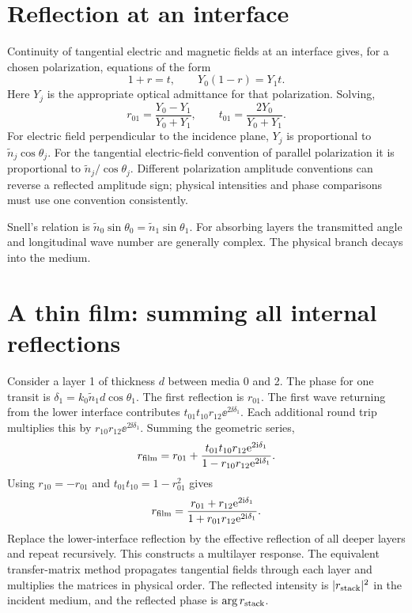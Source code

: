 \section{Reflection at an interface}
Continuity of tangential electric and magnetic fields at an interface
gives, for a chosen polarization, equations of the form
\[
1+r=t,\qquad Y_0(1-r)=Y_1t.
\]
Here $Y_j$ is the appropriate optical admittance for that polarization.
Solving,
\begin{equation}
r_{01}=\frac{Y_0-Y_1}{Y_0+Y_1},\qquad
t_{01}=\frac{2Y_0}{Y_0+Y_1}.
\label{eq:fresnelr}
\end{equation}
For electric field perpendicular to the incidence plane,
$Y_j$ is proportional to $\widetilde n_j\cos\theta_j$.
For the tangential electric-field convention of parallel polarization
it is proportional to $\widetilde n_j/\cos\theta_j$.
Different polarization amplitude conventions can reverse a reflected
amplitude sign; physical intensities and phase comparisons must use
one convention consistently.

Snell's relation is
$\widetilde n_0\sin\theta_0=\widetilde n_1\sin\theta_1$.
For absorbing layers the transmitted angle and longitudinal wave number
are generally complex. The physical branch decays into the medium.

\section{A thin film: summing all internal reflections}
Consider a layer 1 of thickness $d$ between media 0 and 2.
The phase for one transit is
$\delta_1=k_0\widetilde n_1d\cos\theta_1$.
The first reflection is $r_{01}$.
The first wave returning from the lower interface contributes
$t_{01}t_{10}r_{12}\ee^{2\ii\delta_1}$.
Each additional round trip multiplies this by
$r_{10}r_{12}\ee^{2\ii\delta_1}$.
Summing the geometric series,
\[
r_{\rm film}
=r_{01}+
\frac{t_{01}t_{10}r_{12}\mathrm{e}^{2\mathrm{i}\delta_1}}
{1-r_{10}r_{12}\mathrm{e}^{2\mathrm{i}\delta_1}}.
\]
Using $r_{10}=-r_{01}$ and
$t_{01}t_{10}=1-r_{01}^2$ gives
\begin{equation}
r_{\rm film}=
\frac{r_{01}+r_{12}\mathrm{e}^{2\mathrm{i}\delta_1}}
{1+r_{01}r_{12}\mathrm{e}^{2\mathrm{i}\delta_1}}.
\label{eq:thinfilm}
\end{equation}
Replace the lower-interface reflection by the effective reflection of
all deeper layers and repeat recursively. This constructs a multilayer
response. The equivalent transfer-matrix method propagates tangential
fields through each layer and multiplies the matrices in physical order.
The reflected intensity is $|r_{\rm stack}|^2$ in the incident medium,
and the reflected phase is $\arg r_{\rm stack}$.

